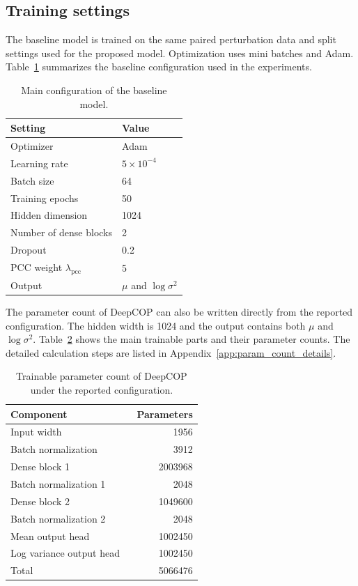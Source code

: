 \subsection{Training settings}
The baseline model is trained on the same paired perturbation data and split settings used for the proposed model. Optimization uses mini batches and Adam. Table~\ref{tab:base_model_config} summarizes the baseline configuration used in the experiments.
\begin{table}[htbp]
    \centering
    \caption[Baseline Model Configuration]{Main configuration of the baseline model.}
    \label{tab:base_model_config}
    \begin{tabular}{ll}
        \hline
        Setting & Value \\
        \hline
        Optimizer & Adam \\
        Learning rate & $5 \times 10^{-4}$ \\
        Batch size & 64 \\
        Training epochs & 50 \\
        Hidden dimension & 1024 \\
        Number of dense blocks & 2 \\
        Dropout & 0.2 \\
        PCC weight $\lambda_{\mathrm{pcc}}$ & 5 \\
        Output & $\mu$ and $\log \sigma^2$ \\
        \hline
    \end{tabular}
\end{table}

\noindent The parameter count of DeepCOP can also be written directly from the reported configuration. The hidden width is 1024 and the output contains both $\mu$ and $\log \sigma^2$. Table~\ref{tab:deepcop_param_count} shows the main trainable parts and their parameter counts. The detailed calculation steps are listed in Appendix~\ref{app:param_count_details}.
\begin{table}[htbp]
    \centering
    \caption[DeepCOP Parameter Count]{Trainable parameter count of DeepCOP under the reported configuration.}
    \label{tab:deepcop_param_count}
    \begin{tabular}{p{0.62\linewidth}r}
        \hline
        Component & Parameters \\
        \hline
        Input width & 1956 \\
        Batch normalization & 3912 \\
        Dense block 1 & 2003968 \\
        Batch normalization 1 & 2048 \\
        Dense block 2 & 1049600 \\
        Batch normalization 2 & 2048 \\
        Mean output head & 1002450 \\
        Log variance output head & 1002450 \\
        \hline
        Total & 5066476 \\
        \hline
    \end{tabular}
\end{table}

